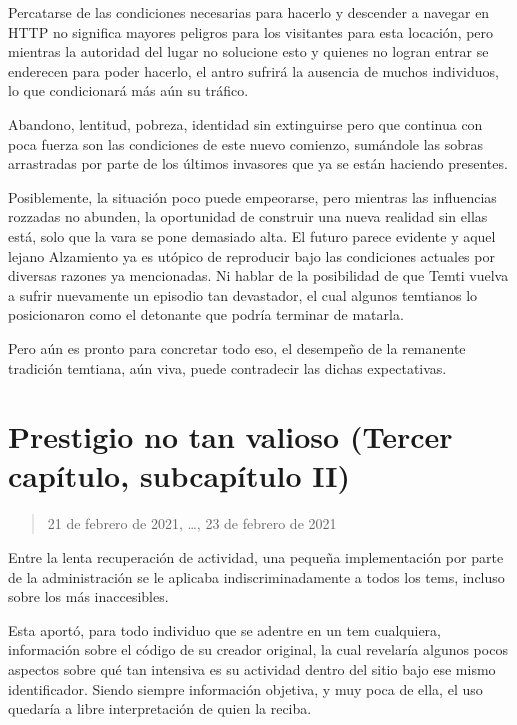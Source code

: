 \documentclass[
  spanish,
]{book}
\begin{document}
Percatarse de las condiciones necesarias para hacerlo y descender a navegar en HTTP no significa mayores peligros para los visitantes para esta locación, pero mientras la autoridad del lugar no solucione esto y quienes no logran entrar se enderecen para poder hacerlo, el antro sufrirá la ausencia de muchos individuos, lo que condicionará más aún su tráfico.

Abandono, lentitud, pobreza, identidad sin extinguirse pero que continua con poca fuerza son las condiciones de este nuevo comienzo, sumándole las sobras arrastradas por parte de los últimos invasores que ya se están haciendo presentes.

Posiblemente, la situación poco puede empeorarse, pero mientras las influencias rozzadas no abunden, la oportunidad de construir una nueva realidad sin ellas está, solo que la vara se pone demasiado alta. El futuro parece evidente y aquel lejano Alzamiento ya es utópico de reproducir bajo las condiciones actuales por diversas razones ya mencionadas. Ni hablar de la posibilidad de que Temti vuelva a sufrir nuevamente un episodio tan devastador, el cual algunos temtianos lo posicionaron como el detonante que podría terminar de matarla.

Pero aún es pronto para concretar todo eso, el desempeño de la remanente tradición temtiana, aún viva, puede contradecir las dichas expectativas.

\hypertarget{prestigio-no-tan-valioso-tercer-capuxedtulo-subcapuxedtulo-ii}{%
\section{Prestigio no tan valioso (Tercer capítulo, subcapítulo II)}\label{prestigio-no-tan-valioso-tercer-capuxedtulo-subcapuxedtulo-ii}}

\begin{quote}
21 de febrero de 2021, \ldots, 23 de febrero de 2021
\end{quote}

Entre la lenta recuperación de actividad, una pequeña implementación por parte de la administración se le aplicaba indiscriminadamente a todos los tems, incluso sobre los más inaccesibles.

Esta aportó, para todo individuo que se adentre en un tem cualquiera, información sobre el código de su creador original, la cual revelaría algunos pocos aspectos sobre qué tan intensiva es su actividad dentro del sitio bajo ese mismo identificador. Siendo siempre información objetiva, y muy poca de ella, el uso quedaría a libre interpretación de quien la reciba.
\end{document}
